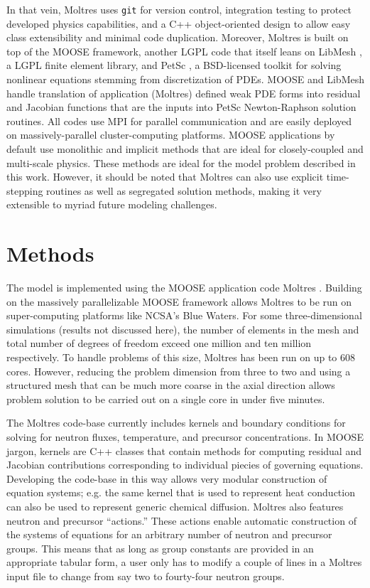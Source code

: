 \documentclass{article}
\let\Oldsection\section
\renewcommand{\section}{\FloatBarrier\Oldsection}
\begin{document}
In that vein, Moltres uses
\texttt{git} for version control, integration testing to protect
developed physics capabilities, and a C++ object-oriented design to allow easy
class extensibility and minimal code duplication. Moreover, Moltres is built on
top of the \gls{MOOSE} framework, \cite{gaston_physics-based_2015} another \gls{LGPL}
code that itself leans on LibMesh \cite{kirk2006libmesh}, a \gls{LGPL} finite element
library, and PetSc \cite{petsc-user-ref}, a \gls{BSD}-licensed toolkit for solving nonlinear
equations stemming from discretization of PDEs. \gls{MOOSE} and LibMesh handle
translation of application (Moltres) defined weak PDE forms into residual and
Jacobian functions that are the inputs into PetSc Newton-Raphson solution
routines. All codes use MPI for parallel communication and are easily deployed
on massively-parallel cluster-computing platforms. \gls{MOOSE} applications by default
use monolithic and implicit methods that are ideal for closely-coupled and
multi-scale physics. These methods are ideal for the model problem described in
this work. However, it should be noted that Moltres can also use explicit
time-stepping routines as well as segregated solution methods, making it very 
extensible to myriad future modeling challenges.

\section{Methods}

The model is implemented using the \gls{MOOSE} \cite{gaston_physics-based_2015} application code
Moltres \cite{lindsay_arfc/moltres_nodate}. Building on the massively
parallelizable \gls{MOOSE} framework allows Moltres to be run on super-computing
platforms like \gls{NCSA}'s Blue Waters. For some three-dimensional simulations
(results not discussed here), the number of elements in the mesh and total
number of degrees of freedom exceed one million and ten million respectively. To
handle problems of this size, Moltres has been run on up to 608 cores. However,
reducing the problem dimension from three to two and using a structured mesh
that can be much more coarse in the axial direction allows problem solution to
be carried out on a single core in under five minutes.

The Moltres code-base currently includes kernels and boundary conditions for
solving for neutron fluxes, temperature, and precursor concentrations. In \gls{MOOSE}
jargon, kernels are C++ classes that contain methods for computing residual and
Jacobian contributions corresponding to individual piecies of governing
equations. Developing the code-base in this way allows very modular construction
of equation systems; e.g. the same kernel that is used to represent heat
conduction can also be used to represent generic chemical diffusion. Moltres
also features neutron and precursor ``actions.'' These actions enable automatic
construction of the systems of equations for an arbitrary number of neutron and
precursor groups. This means that as long as group constants are provided in an appropriate
tabular form, a user only has to modify a couple of lines in a Moltres input
file to change from say two to fourty-four neutron groups.
\end{document}
